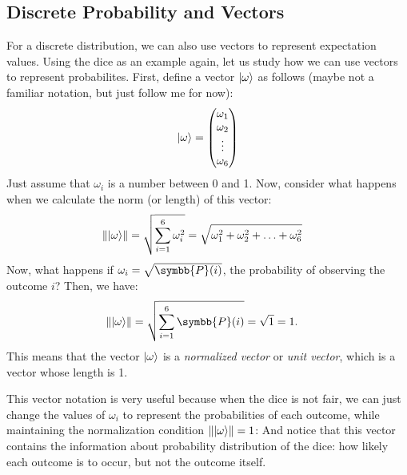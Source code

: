 \subsection{Discrete Probability and Vectors}
For a discrete distribution, we can also use vectors to represent expectation values.
Using the dice as an example again, let us study how we can use vectors to represent probabilites.
First, define a vector $\lvert\omega\rangle$ as follows (maybe not a familiar notation, but just follow me for now):
\begin{align}
  \lvert\omega\rangle = \begin{pmatrix}
                   \omega_1 \\
                   \omega_2 \\
                   \vdots   \\
                   \omega_6
                 \end{pmatrix}
\end{align}
Just assume that $\omega_i$ is a number between 0 and 1.
Now, consider what happens when we calculate the norm (or length) of this vector:
\begin{align}
  \left\lVert \lvert\omega\rangle \right\rVert & = \sqrt{\sum_{i=1}^{6} \omega_i^2} = \sqrt{\omega_1^2 + \omega_2^2 + \ldots + \omega_6^2}
\end{align}
Now, what happens if $\omega_i = \sqrt{\symbb{P}(i)}$, the probability of observing the outcome $i$?
Then, we have:
\begin{align}
  \norm{\ket{\omega}} & = \sqrt{\sum_{i=1}^{6} \symbb{P}(i)} = \sqrt{1} = 1.
\end{align}
This means that the vector $\lvert\omega\rangle$ is a \emph{normalized vector} or \emph{unit vector}, which is a vector whose length is 1.

This vector notation is very useful because when the dice is not fair, we can just change the values of $\omega_i$ to represent the probabilities of each outcome, while maintaining the normalization condition $\left\lVert \lvert\omega\rangle \right\rVert = 1$:
And notice that this vector contains the information about probability distribution of the dice: how likely each outcome is to occur, but not the outcome itself.

